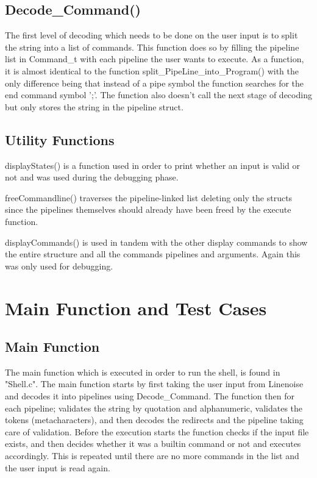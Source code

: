 \documentclass[12pt, a4paper]{report}
\begin{document}
\section{Decode\_Command()}
The first level of decoding which needs to be done on the user input is to split the string into a list of commands. This function does so by filling the pipeline list in Command\_t with each pipeline the user wants to execute. As a function, it is almost identical to the function split\_PipeLine\_into\_Program() with the only difference being that instead of a pipe symbol the function searches for the end command symbol ';'. The function also doesn't call the next stage of decoding but only stores the string in the pipeline struct.

\section{Utility Functions}
displayStates() is a function used in order to print whether an input is valid or not and was used during the debugging phase.

freeCommandline() traverses the pipeline-linked list deleting only the structs since the pipelines themselves should already have been freed by the execute function.

displayCommands() is used in tandem with the other display commands to show the entire structure and all the commands pipelines and arguments. Again this was only used for debugging.

\chapter{Main Function and Test Cases}

\section{Main Function}
The main function which is executed in order to run the shell, is found in "Shell.c". The main function starts by first taking the user input from Linenoise and decodes it into pipelines using Decode\_Command. The function then for each pipeline; validates the string by quotation and alphanumeric, validates the tokens (metacharacters), and then decodes the redirects and the pipeline taking care of validation. Before the execution starts the function checks if the input file exists, and then decides whether it was a builtin command or not and executes accordingly. This is repeated until there are no more commands in the list and the user input is read again.
\end{document}
